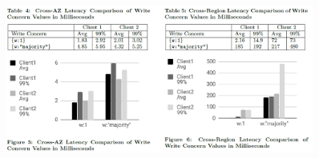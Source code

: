 \documentclass{article}
\begin{document}
\begin{figure}[H]
    \centering
    \includegraphics[width=0.9\textwidth]{Tables.png}
\end{figure}
\end{document}
